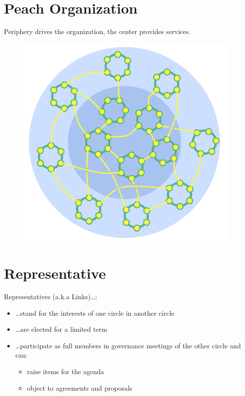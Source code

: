 \section{Peach Organization}
\label{peachorganization}

Periphery drives the organization, the center provides services.

\begin{figure}[htbp]
\centering
\includegraphics[keepaspectratio,width=\textwidth,height=0.75\textheight]{img/structural-patterns/peach-organization.png}
\end{figure}

\section{Representative}
\label{representative}

Representatives (a.k.a Links){\ldots}:

\begin{itemize}
\item {\ldots}stand for the interests of one circle in another circle

\item {\ldots}are elected for a limited term

\item {\ldots}participate as full members in governance meetings of the other circle and can:

\begin{itemize}
\item raise items for the agenda

\item object to agreements and proposals

\end{itemize}

\end{itemize}

